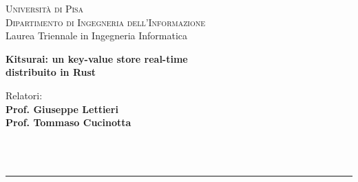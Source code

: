 \begin{titlepage}
    \begin{center}
        \LARGE{\textsc{Università di Pisa}} \\
        \vspace{6pt}
        \Large{\textsc{Dipartimento di Ingegneria dell'Informazione}} \\
        \vspace{6pt}
        \LARGE{Laurea Triennale in Ingegneria Informatica}
    \end{center}
    \vspace{15mm}
    \begin{center}
        \LARGE{\textbf{
            Kitsurai: un key-value store real-time \\
            \vspace{2mm}
            distribuito in Rust
        }}
    \end{center}
    \vspace{30mm}
    \begin{minipage}[t]{0.47\textwidth}
    {
        \large{
            Relatori: \\
            \textbf{Prof. Giuseppe Lettieri} \\
            \textbf{Prof. Tommaso Cucinotta} \\
        }
    }
    \end{minipage}
    \hfill
    \begin{minipage}[t]{0.47\textwidth}
    \end{minipage} \\
    \vspace{4cm} \\
    \hrule
    \vspace{6pt}
\end{titlepage}
\restoregeometry
